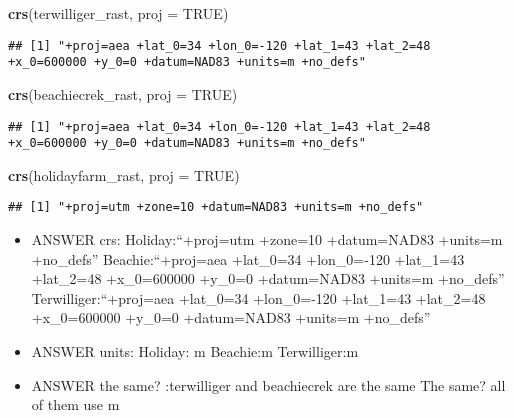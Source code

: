 \documentclass[
]{article}
\newenvironment{Shaded}{\begin{snugshade}}{\end{snugshade}}
\newcommand{\AttributeTok}[1]{\textcolor[rgb]{0.13,0.29,0.53}{#1}}
\newcommand{\ConstantTok}[1]{\textcolor[rgb]{0.56,0.35,0.01}{#1}}
\newcommand{\FunctionTok}[1]{\textcolor[rgb]{0.13,0.29,0.53}{\textbf{#1}}}
\newcommand{\NormalTok}[1]{#1}
\providecommand{\tightlist}{%
  \setlength{\itemsep}{0pt}\setlength{\parskip}{0pt}}
\begin{document}
\begin{Shaded}
\begin{Highlighting}[]
\FunctionTok{crs}\NormalTok{(terwilliger\_rast, }\AttributeTok{proj =} \ConstantTok{TRUE}\NormalTok{)}
\end{Highlighting}
\end{Shaded}

\begin{verbatim}
## [1] "+proj=aea +lat_0=34 +lon_0=-120 +lat_1=43 +lat_2=48 +x_0=600000 +y_0=0 +datum=NAD83 +units=m +no_defs"
\end{verbatim}

\begin{Shaded}
\begin{Highlighting}[]
\FunctionTok{crs}\NormalTok{(beachiecrek\_rast, }\AttributeTok{proj =} \ConstantTok{TRUE}\NormalTok{)}
\end{Highlighting}
\end{Shaded}

\begin{verbatim}
## [1] "+proj=aea +lat_0=34 +lon_0=-120 +lat_1=43 +lat_2=48 +x_0=600000 +y_0=0 +datum=NAD83 +units=m +no_defs"
\end{verbatim}

\begin{Shaded}
\begin{Highlighting}[]
\FunctionTok{crs}\NormalTok{(holidayfarm\_rast, }\AttributeTok{proj =} \ConstantTok{TRUE}\NormalTok{)}
\end{Highlighting}
\end{Shaded}

\begin{verbatim}
## [1] "+proj=utm +zone=10 +datum=NAD83 +units=m +no_defs"
\end{verbatim}

\begin{itemize}
\tightlist
\item
  ANSWER crs: Holiday:``+proj=utm +zone=10 +datum=NAD83 +units=m
  +no\_defs'' Beachie:``+proj=aea +lat\_0=34 +lon\_0=-120 +lat\_1=43
  +lat\_2=48 +x\_0=600000 +y\_0=0 +datum=NAD83 +units=m +no\_defs''
  Terwilliger:``+proj=aea +lat\_0=34 +lon\_0=-120 +lat\_1=43 +lat\_2=48
  +x\_0=600000 +y\_0=0 +datum=NAD83 +units=m +no\_defs''
\item
  ANSWER units: Holiday: m Beachie:m Terwilliger:m
\item
  ANSWER the same? :terwilliger and beachiecrek are the same The same?
  all of them use m
\end{itemize}
\end{document}
